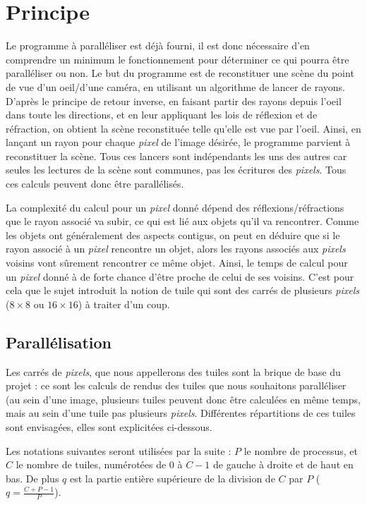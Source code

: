\newpage
\section{Principe}

Le programme à paralléliser est déjà fourni, il est donc nécessaire d'en comprendre un minimum le fonctionnement pour déterminer ce qui pourra être paralléliser ou non. Le but du programme est de reconstituer une scène du point de vue d'un oeil/d'une caméra, en utilisant un algorithme de lancer de rayons. D'après le principe de retour inverse, en faisant partir des rayons depuis l'oeil dans toute les directions, et en leur appliquant les lois de réflexion et de réfraction, on obtient la scène reconstituée telle qu'elle est vue par l'oeil. Ainsi, en lançant un rayon pour chaque \emph{pixel} de l'image désirée, le programme parvient à reconstituer la scène. Tous ces lancers sont indépendants les uns des autres car seules les lectures de la scène sont communes, pas les écritures des \emph{pixels}. Tous ces calculs peuvent donc être parallélisés.

La complexité du calcul pour un \emph{pixel} donné dépend des réflexions/réfractions que le rayon associé va subir, ce qui est lié aux objets qu'il va rencontrer. Comme les objets ont généralement des aspects contigus, on peut en déduire que si le rayon associé à un \emph{pixel} rencontre un objet, alors les rayons associés aux \emph{pixels} voisins vont sûrement rencontrer ce même objet. Ainsi, le temps de calcul pour un \emph{pixel} donné à de forte chance d'être proche de celui de ses voisins. C'est pour cela que le sujet introduit la notion de tuile qui sont des carrés de plusieurs \emph{pixels} ($8\times8$ ou $16\times16$) à traiter d'un coup.

\subsection{Parallélisation}

Les carrés de \emph{pixels}, que nous appellerons des tuiles sont la brique de base du projet : ce sont les calculs de rendus des tuiles que nous souhaitons paralléliser (au sein d'une image, plusieurs tuiles peuvent donc être calculées en même temps, mais au sein d'une tuile pas plusieurs \emph{pixels}. Différentes répartitions de ces tuiles sont envisagées, elles sont explicitées ci-dessous. 

Les notations suivantes seront utilisées par la suite : $P$ le nombre de processus, et $C$ le nombre de tuiles, numérotées de 0 à $C-1$ de gauche à droite et de haut en bas. De plus $q$ est la partie entière supérieure de la division de $C$ par $P$ ($q = \frac{C+P-1}{P}$).

